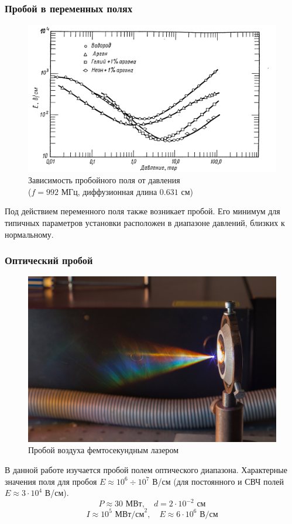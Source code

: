 \documentclass{beamer}
\begin{document}
	\begin{frame}
		\frametitle{Пробой в переменных полях}
		
		\begin{figure}
			\centering
			\includegraphics[width=0.8\linewidth]{res/microwave_discharge.png}
			\caption*{Зависимость пробойного поля от давления\\ ($f = 992$ МГц, диффузионная длина $0.631$ см)}
		\end{figure}
		
		Под действием переменного поля также возникает пробой. Его минимум для типичных параметров установки расположен в диапазоне давлений, близких к нормальному.
	\end{frame}

	\begin{frame}
		\frametitle{Оптический пробой}
		\begin{figure}
			\centering
			\includegraphics[width=0.6\linewidth]{res/femtosecond_laser_spark.jpg}
			\caption*{Пробой воздуха фемтосекундным лазером}
		\end{figure}
		В данной работе изучается пробой полем оптического диапазона. Характерные значения поля для пробоя $E \approx 10^6 \div 10^7$ В/см (для постоянного и СВЧ полей $E \approx 3 \cdot 10^4$ В/см). 
		$$ P \approx 30 \text{ МВт}, \quad d = 2 \cdot 10^{-2} \text{ см} $$
		$$ I \approx 10^5 \text{ МВт/см}^2, \quad E \approx 6 \cdot 10^6 \text{ В/см} $$

	
	\end{frame}
\end{document}
